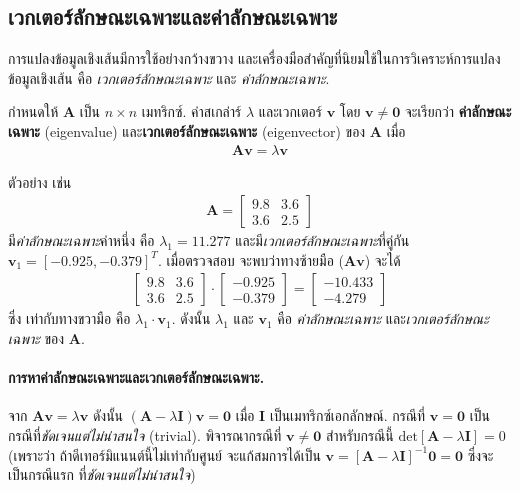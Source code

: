 \subsection{เวกเตอร์ลักษณะเฉพาะและค่าลักษณะเฉพาะ}
\label{sec: Eigenvectors and Eigenvalues}

การแปลงข้อมูลเชิงเส้นมีการใช้อย่างกว้างขวาง 
และเครื่องมือสำคัญที่นิยมใช้ในการวิเคราะห์การแปลงข้อมูลเชิงเส้น คือ
\textit{เวกเตอร์ลักษณะเฉพาะ}
และ
\textit{ค่าลักษณะเฉพาะ}.

กำหนดให้ $\bm{A}$ เป็น $n \times n$ เมทริกซ์. 
ค่าสเกล่าร์ $\lambda$ และเวกเตอร์ $\bm{v}$ โดย $\bm{v} \neq \bm{0}$  
จะเรียกว่า \textbf{ค่าลักษณะเฉพาะ} (eigenvalue) และ\textbf{เวกเตอร์ลักษณะเฉพาะ} (eigenvector) ของ $\bm{A}$ เมื่อ
\begin{eqnarray}
\bm{A} \bm{v} = \lambda \bm{v}
\label{eq: linalg eigen}
\end{eqnarray}

ตัวอย่าง เช่น
\begin{eqnarray}
\bm{A} = \begin{bmatrix}
9.8 & 3.6 \\
3.6 & 2.5
\end{bmatrix}
\nonumber
\end{eqnarray}
มี\textit{ค่าลักษณะเฉพาะ}ค่าหนึ่ง คือ $\lambda_1 = 11.277$ 
และมี\textit{เวกเตอร์ลักษณะเฉพาะ}ที่คู่กัน $\bm{v}_1 = [-0.925, -0.379]^T$.
เมื่อตรวจสอบ จะพบว่าทางซ้ายมือ ($\bm{A} \bm{v}$) จะได้
\begin{eqnarray}
\begin{bmatrix}
9.8 & 3.6 \\
3.6 & 2.5
\end{bmatrix}
\cdot
\begin{bmatrix}
-0.925 \\
-0.379
\end{bmatrix}
= 
\begin{bmatrix}
-10.433 \\
-4.279
\end{bmatrix}
\nonumber
\end{eqnarray}
ซึ่ง เท่ากับทางขวามือ คือ $\lambda_1 \cdot \mathbf{v}_1$. 
ดังนั้น $\lambda_1$ และ $\mathbf{v}_1$ 
คือ 
\textit{ค่าลักษณะเฉพาะ}
และ\textit{เวกเตอร์ลักษณะเฉพาะ}
ของ $\bm{A}$.

\paragraph{การหาค่าลักษณะเฉพาะและเวกเตอร์ลักษณะเฉพาะ.}
จาก $\bm{A} \bm{v} = \lambda \bm{v}$ 
ดังนั้น $(\bm{A} - \lambda \bm{I}) \bm{v} = \bm{0}$
เมื่อ $\bm{I}$ เป็นเมทริกซ์เอกลักษณ์.
กรณีที่ $\bm{v} = \bm{0}$ เป็นกรณีที่\textit{ชัดเจนแต่ไม่น่าสนใจ} (trivial).
พิจารณากรณีที่ $\bm{v} \neq \bm{0}$
สำหรับกรณีนี้ $\mathrm{det} [\bm{A} - \lambda \bm{I}] = 0$
(เพราะว่า ถ้าดีเทอร์มิแนนต์นี้ไม่เท่ากับศูนย์ จะแก้สมการได้เป็น $\bm{v} = [\bm{A} - \lambda \bm{I}]^{-1} \bm{0} = \bm{0}$ ซึ่งจะเป็นกรณีแรก ที่\textit{ชัดเจนแต่ไม่น่าสนใจ})

